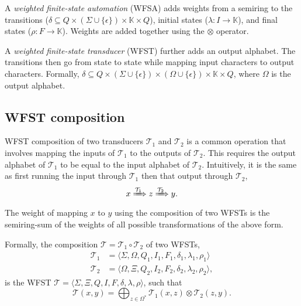 
A \textit{weighted finite-state automation} (WFSA) adds weights from a semiring
to the transitions ($\delta\subseteq Q\times (\Sigma \cup \{ \epsilon \})
    \times \mathbb{K} \times Q$), initial states ($\lambda: I\to\mathbb{K}$), and
final states  ($\rho: F\to\mathbb{K}$). Weights are added together using the
$\otimes$ operator.

A \textit{weighted finite-state transducer} (WFST) further adds an output
alphabet. The transitions then go from state to state while mapping input
characters to output characters. Formally, $\delta \subseteq Q \times (\Sigma
    \cup \{\epsilon\}) \times (\Omega \cup \{\epsilon\}) \times \mathbb{K} \times
    Q$, where $\Omega$ is the output alphabet.

\subsection{WFST composition}

WFST composition of two transducers $\mathcal{T}_1$ and $\mathcal{T}_2$ is a
common operation that involves mapping the inputs of $\mathcal{T}_1$ to the
outputs of $\mathcal{T}_2$. This requires the output alphabet of
$\mathcal{T}_1$ to be equal to the input alphabet of $\mathcal{T}_2$.
Intuitively, it is the same as first running the input through $\mathcal{T}_1$
then that output through $\mathcal{T}_2$, \[
    x \xRightarrow{\mathcal{T}_1} z \xRightarrow{\mathcal{T}_2} y
    .\]
The weight of mapping $x$ to $y$ using the composition of two WFSTs is the
semiring-sum of the weights of all possible transformations of the above form.

\begin{definition}
    Formally, the composition $\mathcal{T}=\mathcal{T}_1 \circ \mathcal{T}_2$
    of two WFSTs,
    \begin{align*}
        \mathcal{T}_1 & = \langle \Sigma,\Omega,Q_1,I_1,F_1,\delta_1,\lambda_1,\rho_1 \rangle \\
        \mathcal{T}_2 & = \langle \Omega,\Xi,Q_2,I_2,F_2,\delta_2,\lambda_2,\rho_2 \rangle
        ,\end{align*}
    is the WFST $\mathcal{T}=\langle
        \Sigma,\Xi,Q,I,F,\delta,\lambda,\rho \rangle$, such that \[
        \mathcal{T}(x,y) = \bigoplus_{z\in\Omega^*} \mathcal{T}_1(x,z) \otimes \mathcal{T}_2(z,y)
        .\]
\end{definition}


